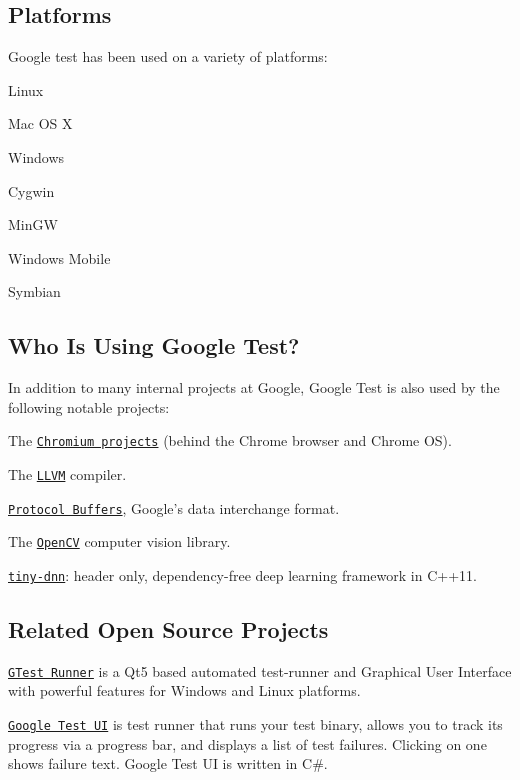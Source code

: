 \subsection*{Platforms}

Google test has been used on a variety of platforms\-:


\begin{DoxyItemize}
\item Linux
\item Mac O\-S X
\item Windows
\item Cygwin
\item Min\-G\-W
\item Windows Mobile
\item Symbian
\end{DoxyItemize}

\subsection*{Who Is Using Google Test?}

In addition to many internal projects at Google, Google Test is also used by the following notable projects\-:


\begin{DoxyItemize}
\item The \href{http://www.chromium.org/}{\tt Chromium projects} (behind the Chrome browser and Chrome O\-S).
\item The \href{http://llvm.org/}{\tt L\-L\-V\-M} compiler.
\item \href{https://github.com/google/protobuf}{\tt Protocol Buffers}, Google's data interchange format.
\item The \href{http://opencv.org/}{\tt Open\-C\-V} computer vision library.
\item \href{https://github.com/tiny-dnn/tiny-dnn}{\tt tiny-\/dnn}\-: header only, dependency-\/free deep learning framework in C++11.
\end{DoxyItemize}

\subsection*{Related Open Source Projects}

\href{https://github.com/nholthaus/gtest-runner}{\tt G\-Test Runner} is a Qt5 based automated test-\/runner and Graphical User Interface with powerful features for Windows and Linux platforms.

\href{https://github.com/ospector/gtest-gbar}{\tt Google Test U\-I} is test runner that runs your test binary, allows you to track its progress via a progress bar, and displays a list of test failures. Clicking on one shows failure text. Google Test U\-I is written in C\#.

